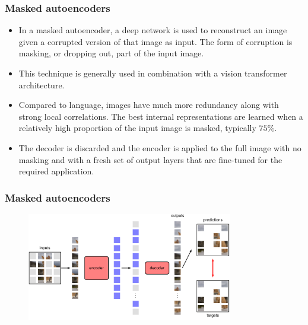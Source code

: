 \documentclass{beamer}
\begin{document}
\begin{frame}
    \frametitle{Masked autoencoders}
    \begin{itemize}
        \item In a masked autoencoder, a deep network is used to reconstruct an image given a corrupted version of that image as input. The form of corruption is masking, or dropping out, part of the input image.
        \item This technique is generally used in combination with a vision transformer architecture.
        \item Compared to language, images have much more redundancy along with strong local correlations. The best internal representations are learned when a relatively high proportion of the input image is masked, typically $75\%$.
        \item The decoder is discarded and the encoder is applied to the full image with no masking and with a fresh set of output layers that are fine-tuned for the required application.
    \end{itemize}
\end{frame}

\begin{frame}
    \frametitle{Masked autoencoders}
    \begin{figure}
        \includegraphics[width=0.8\textwidth]{Figure_5.pdf}
    \end{figure}
\end{frame}
\end{document}
